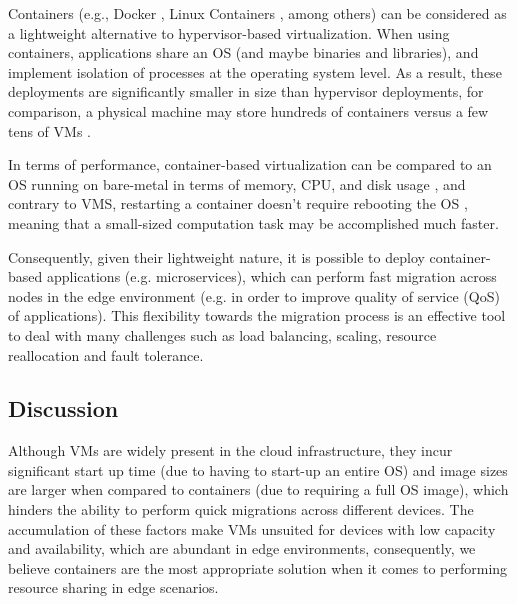 Containers (e.g., Docker \cite{docker}, Linux Containers \cite{lxc}, among others) can be considered as a lightweight alternative to hypervisor-based virtualization. When using containers, applications share an OS (and maybe binaries and libraries), and implement isolation of processes at the operating system level. As a result, these deployments are significantly smaller in size than hypervisor deployments, for comparison, a physical machine may store hundreds of containers versus a few tens of VMs \cite{7036275}.  

In terms of performance, container-based virtualization can be compared to an OS running on bare-metal in terms of memory, CPU, and disk usage \cite{preeth2015evaluation}, and contrary to VMS, restarting a container doesn't require rebooting the OS \cite{7036275}, meaning that a small-sized computation task may be accomplished much faster. 

Consequently, given their lightweight nature, it is possible to deploy container-based applications (e.g. microservices), which can perform fast migration across nodes in the edge environment (e.g. in order to improve quality of service (QoS) of applications). This flexibility towards the migration process is an effective tool to deal with many challenges such as load balancing, scaling, resource reallocation and fault tolerance. 

\subsection{Discussion}

Although VMs are widely present in the cloud infrastructure, they incur significant start up time (due to having to start-up an entire OS) and image sizes are larger when compared to containers (due to requiring a full OS image), which hinders the ability to perform quick migrations across different devices. The accumulation of these factors make VMs unsuited for devices with low capacity and availability, which are abundant in edge environments, consequently, we believe containers are the most appropriate solution when it comes to performing resource sharing in edge scenarios. 